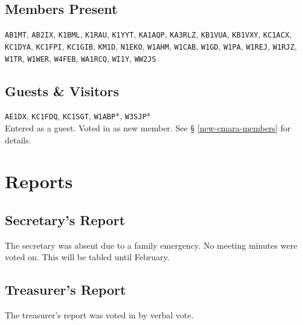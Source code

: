 \documentclass[10pt,letterpaper]{article}
\begin{document}
\subsection{Members Present}
\texttt{AB1MT},
\texttt{AB2IX},
\texttt{K1BML},
\texttt{K1RAU},
\texttt{K1YYT},
\texttt{KA1AQP},
\texttt{KA3RLZ},
\texttt{KB1VUA},
\texttt{KB1VXY},
\texttt{KC1ACX},
\texttt{KC1DYA},
\texttt{KC1FPI},
\texttt{KC1GIB},
\texttt{KM1D},
\texttt{N1EKO},
\texttt{W1AHM},
\texttt{W1CAB},
\texttt{W1GD},
\texttt{W1PA},
\texttt{W1REJ},
\texttt{W1RJZ},
\texttt{W1TR},
\texttt{W1WER},
\texttt{W4FEB},
\texttt{WA1RCQ},
\texttt{WI1Y},
\texttt{WW2JS}

\subsection{Guests \& Visitors}

\texttt{AE1DX},
\texttt{KC1FDQ},
\texttt{KC1SGT},
\texttt{W1ABP}*,
\texttt{W3SJP}*\\

\noindent
\textasteriskcentered{} Entered as a guest. Voted in as new member. See \S{} \ref{new-cmara-members} for details.

\section{Reports}

\subsection{Secretary's Report}
The secretary was absent due to a family emergency. No meeting minutes were voted on. This will be tabled until February.

\newpage
\subsection{Treasurer's Report}
The treasurer's report was voted in by verbal vote.
\end{document}
